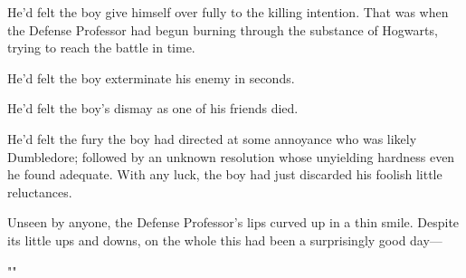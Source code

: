 He'd felt the boy give himself over fully to the killing intention. That was
when the Defense Professor had begun burning through the substance of Hogwarts,
trying to reach the battle in time.

He'd felt the boy exterminate his enemy in seconds.

He'd felt the boy's dismay as one of his friends died.

He'd felt the fury the boy had directed at some annoyance who was likely
Dumbledore; followed by an unknown resolution whose unyielding hardness even he
found adequate. With any luck, the boy had just discarded his foolish little
reluctances.

Unseen by anyone, the Defense Professor's lips curved up in a thin smile.
Despite its little ups and downs, on the whole this had been a surprisingly
good day\mbox{---}

""
